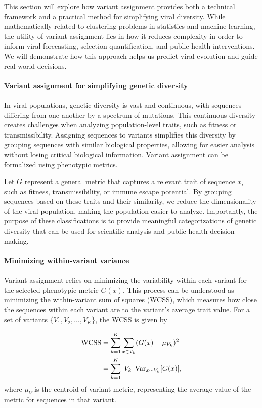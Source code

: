 This section will explore how variant assignment provides both a technical framework and a practical method for simplifying viral diversity.
While mathematically related to clustering problems in statistics and machine learning, the utility of variant assignment lies in how it reduces complexity in order to inform viral forecasting, selection quantification, and public health interventions.
We will demonstrate how this approach helps us predict viral evolution and guide real-world decisions.

\paragraph{Variant assignment for simplifying genetic diversity}

In viral populations, genetic diversity is vast and continuous, with sequences differing from one another by a spectrum of mutations. This continuous diversity creates challenges when analyzing population-level traits, such as fitness or transmissibility. Assigning sequences to variants simplifies this diversity by grouping sequences with similar biological properties, allowing for easier analysis without losing critical biological information.
Variant assignment can be formalized using phenotypic metrics.

Let $G$ represent a general metric that captures a relevant trait of sequence $x_i$ such as fitness, transmissibility, or immune escape potential.
By grouping sequences based on these traits and their similarity, we reduce the dimensionality of the viral population, making the population easier to analyze.
Importantly, the purpose of these classifications is to provide meaningful categorizations of genetic diversity that can be used for scientific analysis and public health decision-making.

\paragraph{Minimizing within-variant variance}

Variant assignment relies on minimizing the variability within each variant for the selected phenotypic metric $G(x)$.
This process can be understood as minimizing the within-variant sum of squares (WCSS), which measures how close the sequences within each variant are to the variant’s average trait value.
For a set of variants \( \{V_1, V_2, \dots, V_K\} \), the WCSS is given by

\begin{align}
\text{WCSS} &= \sum_{k=1}^{K} \sum_{x \in V_{k}} (G(x) - \mu_{V_k})^2\\
            &= \sum_{k=1}^{K} \left| V_k \right| \text{Var}_{x \sim V_k}[G(x)],
\end{align}
where $\mu_V$ is the centroid of variant metric, representing the average value of the metric for sequences in that variant.

